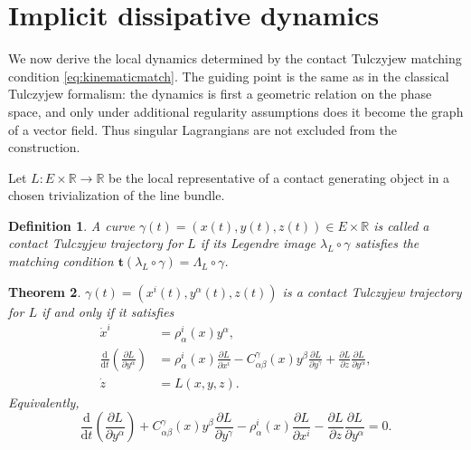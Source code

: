 \documentclass[10pt,a4paper]{amsart}
\newtheorem{theorem}{Theorem}[section]
\newtheorem{definition}[theorem]{Definition}
\newcommand{\R}{\mathbb{R}}
\newcommand{\dd}{\mathrm{d}}
\begin{document}
\section{Implicit dissipative dynamics}
\label{sec:dynamics}

We now derive the local dynamics determined by the contact Tulczyjew
matching condition \eqref{eq:kinematicmatch}.
The guiding point is the same as in the classical Tulczyjew formalism:
the dynamics is first a geometric relation on the phase space, and only
under additional regularity assumptions does it become the graph of a
vector field. Thus singular Lagrangians are not excluded from the
construction.

Let $L:E\times\R\longrightarrow\R$ be the local representative of a contact generating object in a chosen
trivialization of the line bundle. 

\begin{definition}
A curve $\gamma(t)=(x(t),y(t),z(t))\in E\times\R$ is called a \emph{contact Tulczyjew trajectory} for \(L\) if its
Legendre image \(\lambda_L\circ\gamma\) satisfies the matching condition $\mathbf t(\lambda_L\circ\gamma)=\Lambda_L\circ\gamma$.
\end{definition}


\begin{theorem}
\label{thm:implicitdynamics} $\gamma(t)=(x^i(t),y^\alpha(t),z(t))$ is a contact Tulczyjew
trajectory for \(L\) if and only if it satisfies
\begin{align}
\dot x^i
&=
\rho^i_{\alpha}(x)y^\alpha,
\label{eq:ELH1}
\\
\frac{\dd}{\dd t}
\left(
\frac{\partial L}{\partial y^\alpha}
\right)
&=
\rho^i_{\alpha}(x)\frac{\partial L}{\partial x^i}
-
C^\gamma_{\alpha\beta}(x)y^\beta
\frac{\partial L}{\partial y^\gamma}
+
\frac{\partial L}{\partial z}
\frac{\partial L}{\partial y^\alpha},
\label{eq:ELH2}
\\
\dot z
&=
L(x,y,z).
\label{eq:ELH3}
\end{align}
Equivalently,
\begin{equation}
\frac{\dd}{\dd t}
\left(
\frac{\partial L}{\partial y^\alpha}
\right)
+
C^\gamma_{\alpha\beta}(x)y^\beta
\frac{\partial L}{\partial y^\gamma}
-
\rho^i_{\alpha}(x)\frac{\partial L}{\partial x^i}
-
\frac{\partial L}{\partial z}
\frac{\partial L}{\partial y^\alpha}
=
0.
\label{eq:ELHfinal}
\end{equation}
\end{theorem}
\end{document}
